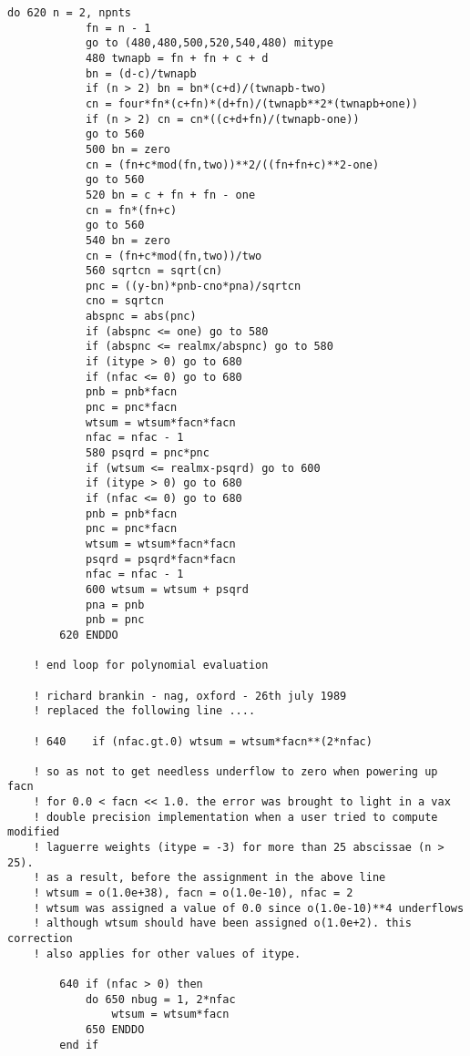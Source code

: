 \documentclass[12pt]{article}
\begin{document}
\begin{lstlisting}[frame=single,caption={{\tt d01b.f90}},label=d01b]
        do 620 n = 2, npnts
            fn = n - 1
            go to (480,480,500,520,540,480) mitype
            480 twnapb = fn + fn + c + d
            bn = (d-c)/twnapb
            if (n > 2) bn = bn*(c+d)/(twnapb-two)
            cn = four*fn*(c+fn)*(d+fn)/(twnapb**2*(twnapb+one))
            if (n > 2) cn = cn*((c+d+fn)/(twnapb-one))
            go to 560
            500 bn = zero
            cn = (fn+c*mod(fn,two))**2/((fn+fn+c)**2-one)
            go to 560
            520 bn = c + fn + fn - one
            cn = fn*(fn+c)
            go to 560
            540 bn = zero
            cn = (fn+c*mod(fn,two))/two
            560 sqrtcn = sqrt(cn)
            pnc = ((y-bn)*pnb-cno*pna)/sqrtcn
            cno = sqrtcn
            abspnc = abs(pnc)
            if (abspnc <= one) go to 580
            if (abspnc <= realmx/abspnc) go to 580
            if (itype > 0) go to 680
            if (nfac <= 0) go to 680
            pnb = pnb*facn
            pnc = pnc*facn
            wtsum = wtsum*facn*facn
            nfac = nfac - 1
            580 psqrd = pnc*pnc
            if (wtsum <= realmx-psqrd) go to 600
            if (itype > 0) go to 680
            if (nfac <= 0) go to 680
            pnb = pnb*facn
            pnc = pnc*facn
            wtsum = wtsum*facn*facn
            psqrd = psqrd*facn*facn
            nfac = nfac - 1
            600 wtsum = wtsum + psqrd
            pna = pnb
            pnb = pnc
        620 ENDDO
    
    ! end loop for polynomial evaluation
    
    ! richard brankin - nag, oxford - 26th july 1989
    ! replaced the following line ....
    
    ! 640    if (nfac.gt.0) wtsum = wtsum*facn**(2*nfac)
    
    ! so as not to get needless underflow to zero when powering up facn
    ! for 0.0 < facn << 1.0. the error was brought to light in a vax
    ! double precision implementation when a user tried to compute modified
    ! laguerre weights (itype = -3) for more than 25 abscissae (n > 25).
    ! as a result, before the assignment in the above line
    ! wtsum = o(1.0e+38), facn = o(1.0e-10), nfac = 2
    ! wtsum was assigned a value of 0.0 since o(1.0e-10)**4 underflows
    ! although wtsum should have been assigned o(1.0e+2). this correction
    ! also applies for other values of itype.
    
        640 if (nfac > 0) then
            do 650 nbug = 1, 2*nfac
                wtsum = wtsum*facn
            650 ENDDO
        end if
    

\end{lstlisting}
\end{document}
